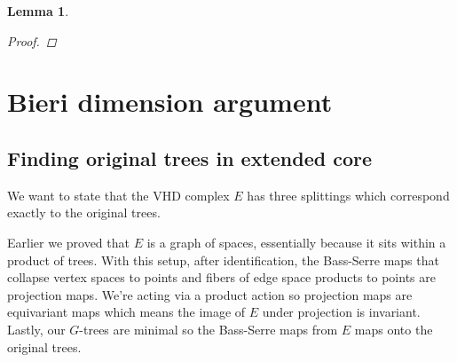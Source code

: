 \documentclass[12pt,parskip=full]{report}
\theoremstyle{plain}
\newtheorem{lem}[thm]{Lemma}
\theoremstyle{definition}
\begin{document}
\begin{lem}
\begin{proof}
        



        
    

    \end{proof}
\end{lem}

\section{Bieri dimension argument}

\subsection{Finding original trees in extended core}
We want to state that the VHD complex \(E\) has three splittings which correspond exactly to the original trees.

Earlier we proved that \(E\) is a graph of spaces, essentially because it sits within a product of trees. With this setup, after identification, the Bass-Serre maps that collapse vertex spaces to points and fibers of edge space products to points are projection maps. We're acting via a product action so projection maps are equivariant maps which means the image of \(E\) under projection is invariant. Lastly, our \(G\)-trees are minimal so the Bass-Serre maps from \(E\) maps onto the original trees.
\end{document}
